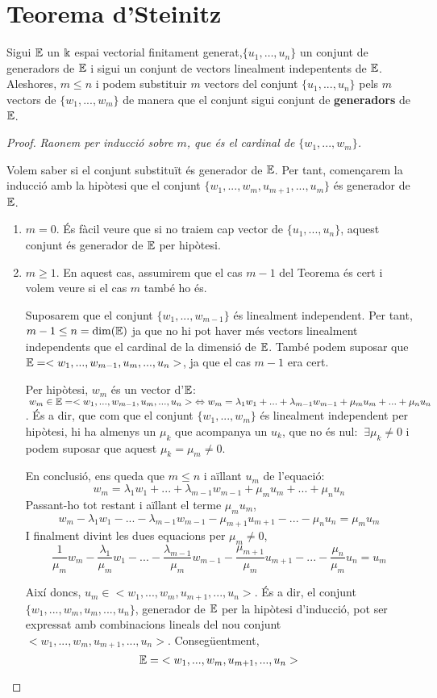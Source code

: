 \section{Teorema d'Steinitz}
Sigui $\mathbb{E}$ un $\Bbbk$ espai vectorial finitament generat,$\{u_1,\dots, u_n\}$ un conjunt de generadors de $\mathbb{E}$ i sigui un conjunt de vectors linealment indepentents de $\mathbb{E}$. Aleshores, $m \leq n$ i podem substituir $m$ vectors del conjunt $\{u_1, ..., u_n\}$ pels $m$ vectors de $\{w_1,..., w_m\}$ de manera que el conjunt sigui conjunt de \textbf{generadors} de $\mathbb{E}$.
\\

\begin{proof}
\textit{Raonem per inducció sobre $m$, que és el cardinal de $\{w_1,..., w_m\}$.}

Volem saber si el conjunt substituït és generador de $\mathbb{E}$. Per tant, començarem la inducció amb la hipòtesi que el conjunt $\{w_1,..., w_m, u_{m+1}, ..., u_m\}$ és generador de $\mathbb{E}$.
\begin{enumerate}[(1)]
\item $m = 0$.
És fàcil veure que si no traiem cap vector de $\{u_1,..., u_n\}$, aquest conjunt és generador de $\mathbb{E}$ per hipòtesi.

\item $m \geq 1$. 
En aquest cas, assumirem que el cas $m-1$ del Teorema és cert i volem veure si el cas $m$ també ho és.

Suposarem que el conjunt $\{w_1,..., w_{m-1}\}$ és linealment independent. Per tant, $m-1 \leq n = \dim(\mathbb{E})$ ja que no hi pot haver més vectors linealment independents que el cardinal de la dimensió de $\mathbb{E}$. També podem suposar que $\mathbb{E} = <w_1,...,w_{m-1},u_m,...,u_n>$, ja que el cas $m-1$ era cert.

Per hipòtesi, $w_m$ és un vector d'$\mathbb{E}$: $\:w_m \in \mathbb{E} = <w_1,...,w_{m-1},u_m,...,u_n> \;\Leftrightarrow  w_m = \lambda_1 w_1 + ... + \lambda_{m-1}w_{m-1} + \mu_mu_m + ... + \mu_nu_n$. És a dir, que com que el conjunt $\{w_1,..., w_m\}$ és linealment independent per hipòtesi, hi ha almenys un $\mu_k$ que acompanya un $u_k$, que no és nul: $\:\exists\mu_k \neq 0$ i podem suposar que aquest $\mu_k = \mu_m \neq 0$.

En conclusió, ens queda que $m \leq n$ i aïllant $u_m$ de l'equació:
\[
w_m = \lambda_1w_1 + ... + \lambda_{m-1}w_{m-1} + \mu_mu_m + ... + \mu_nu_n
\]
Passant-ho tot restant i aïllant el terme $\mu_mu_m$,
\[
w_m - \lambda_1w_1 - ... - \lambda_{m-1}w_{m-1} - \mu_{m+1}u_{m+1} - ... - \mu_nu_n = \mu_mu_m
\]
I finalment divint les dues equacions per $\mu_m \neq 0$,
\[
\frac{1}{\mu_m}w_m - \frac{\lambda_1}{\mu_m}w_1 - ... - \frac{\lambda_{m-1}}{\mu_m}w_{m-1} - \frac{\mu_{m+1}}{\mu_m}u_{m+1} - ... - \frac{\mu_n}{\mu_m}u_n = u_m
\]

Així doncs, $u_m \in <w_1,...,w_m,u_{m+1},...,u_n>$. És a dir, el conjunt $\{w_1,...,w_m,u_{m},...,u_n\}$, generador de $\mathbb{E}$ per la hipòtesi d'inducció, pot ser expressat amb combinacions lineals del nou conjunt $<w_1,...,w_m,u_{m+1},...,u_n>$. Consegüentment, 
\[
\mathbb{E} = \;<w_1,...,w_m,u_{m+1},...,u_n>
\]
\end{enumerate}
\end{proof}

